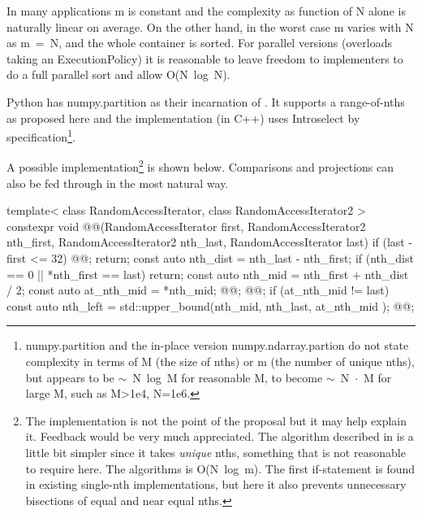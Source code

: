 In many applications m is constant and the complexity as function of N alone is naturally linear on average. On the other hand, in the worst case m varies with N as \mbox{m = N}, and the whole container is sorted. For parallel versions (overloads taking an ExecutionPolicy) it is reasonable to leave freedom to implementers to do a full parallel sort and allow \mbox{O(N log N)}.

Python has numpy.partition\cite{NpPart} as their incarnation of .
It supports a range-of-nths as proposed here and the implementation\cite{NPImpl} (in C++) uses \mbox{Introselect\cite{Musser1997}} by specification\footnote{numpy.partition and the in-place version numpy.ndarray.partion do not state complexity in terms of M (the size of nths) or m (the number of unique nths), but appears to be \mbox{$\sim$ N log M} for reasonable M, to become \mbox{$\sim$ N $\cdot$ M} for large M, such as M>1e4, N=1e6. }.

A possible implementation\footnote{
The implementation is not the point of the proposal but it may help explain it. Feedback would be very much appreciated. 
The algorithm described in \cite{Alsuwaiyel2001} is a little bit simpler since it takes \emph{unique} nths, something that is not reasonable to require here. The algorithms is \mbox{O(N log m)}. The first if-statement is found in existing single-nth  implementations, but here it also prevents unnecessary bisections of equal and near equal nths.}\cite{p2375RefImpl}
is shown below. Comparisons and projections can also be fed through in the most natural way. 

\begin{codeblock}
template< class RandomAccessIterator, class RandomAccessIterator2 >
constexpr void @@(RandomAccessIterator first, 
  RandomAccessIterator2 nth_first, RandomAccessIterator2 nth_last, 
  RandomAccessIterator last)
{
  if (last - first <= 32) { @@; return; }
  const auto nth_dist = nth_last - nth_first;
  if (nth_dist == 0 || *nth_first == last) return;
  const auto nth_mid = nth_first + nth_dist / 2;
  const auto at_nth_mid = *nth_mid;
  @@;
  @@;
  if (at_nth_mid != last){
    const auto nth_left = std::upper_bound(nth_mid, nth_last, at_nth_mid );
    @@;
  }
}

\end{codeblock}

